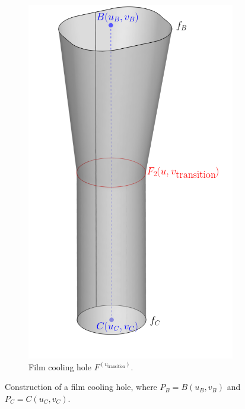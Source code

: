 \documentclass[a4paper, 11pt]{report}
\theoremstyle{definition}
\begin{document}
\begin{figure}[H]
\begin{subfigure}{.35\textwidth}
			\includegraphics[width=\textwidth]{../tec/holes/01edit.png}
			\caption{Film cooling hole $F^{(v_\textrm{transition})}$.}
		\end{subfigure}
		\caption{Construction of a film cooling hole, where $P_B = B(u_B, v_B)$ and $P_C = C(u_C, v_C)$.}
		\label{fig:filmcooling_construction}
	\end{figure}
\end{document}
